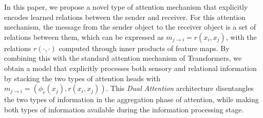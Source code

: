 
In this paper, we propose a novel type of attention mechanism that explicitly encodes learned relations between the sender and receiver. For this attention mechanism, the message from the sender object to the receiver object is a set of relations between them, which can be expressed as $m_{j \to i} = r(x_i, x_j)$, with the relations $r(\cdot,\cdot)$ computed through inner products of feature maps. By combining this with the standard attention mechanism of Transformers, we obtain a model that explicitly processes both sensory and relational information by stacking the two types of attention heads with $m_{j \to i} = (\phi_v(x_j), r(x_i, x_j))$. This \textit{Dual Attention} architecture disentangles the two types of information in the aggregation phase of attention, while making both types of information available during the information processing stage.


